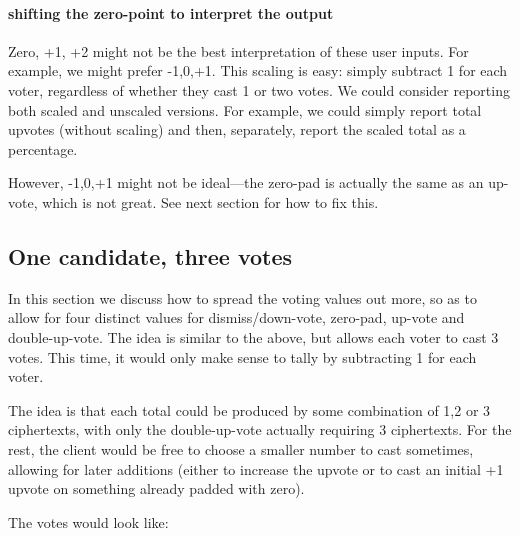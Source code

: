\documentclass[10pt,a4paper]{article}
\begin{document}
\paragraph{shifting the zero-point to interpret the output}
Zero, +1, +2 might not be the best interpretation of these user inputs. For example, we might prefer -1,0,+1. This scaling is easy: simply subtract 1 for each voter, regardless of whether they cast 1 or two votes. We could consider reporting both scaled and unscaled versions. For example, we could simply report total upvotes (without scaling) and then, separately, report the scaled total as a percentage.

However, -1,0,+1 might not be ideal---the zero-pad is actually the same as an up-vote, which is not great. See next section for how to fix this. 
 
\subsection{One candidate, three votes}
In this section we discuss how to spread the voting values out more, so as to allow for four distinct values for dismiss/down-vote, zero-pad, up-vote and double-up-vote. The idea is similar to the above, but allows each voter to cast 3 votes.
This time, it would only make sense to tally by subtracting 1 for each voter.

The idea is that each total could be produced by some combination of 1,2 or 3 ciphertexts, with only the double-up-vote actually requiring 3 ciphertexts. For the rest, the client would be free to choose a smaller number to cast sometimes, allowing for later additions (either to increase the upvote or to cast an initial +1 upvote on something already padded with zero).

The votes would look like:
\end{document}
